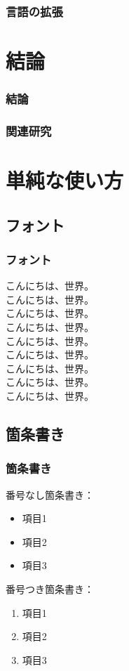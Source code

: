 \documentclass[dvipdfmx,cjk,xcolor=dvipsnames,envcountsect,notheorems,12pt]{beamer}
\theoremstyle{definition}
\begin{document}
\begin{frame}
	\frametitle{言語の拡張}
\end{frame}

\section{結論}

\begin{frame}
	\frametitle{結論}
\end{frame}

\begin{frame}
	\frametitle{関連研究}
\end{frame}


\section{単純な使い方}

\subsection{フォント}

\begin{frame}
  \frametitle{フォント}
  {\scriptsize こんにちは、世界。}\\
  {\footnotesize こんにちは、世界。}\\
  {\small こんにちは、世界。}\\
  こんにちは、世界。\\%
  {\large こんにちは、世界。}\\
  {\Large こんにちは、世界。}\\
  {\LARGE こんにちは、世界。}\\
  {\Huge こんにちは、世界。}
  \vfill%
  \\%
  \alert{こんにちは、世界。}%
\end{frame}

\subsection{箇条書き}

\begin{frame}
  \frametitle{箇条書き}
  番号なし箇条書き：
  \begin{itemize}
  \item 項目1
  \item 項目2
  \item 項目3
  \end{itemize}
  番号つき箇条書き：
  \begin{enumerate}
  \item 項目1
  \item 項目2
  \item 項目3
  \end{enumerate}
\end{frame}
\end{document}
